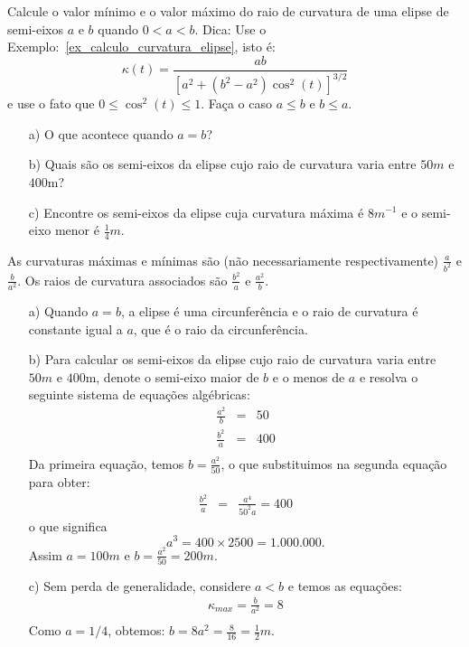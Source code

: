 \begin{exeresol}
Calcule o valor mínimo e o valor máximo do raio de curvatura de uma elipse de semi-eixos $a$ e $b$ quando $0<a<b$.
Dica: Use o Exemplo:~\ref{ex_calculo_curvatura_elipse}, isto é:
$$\kappa(t)=\frac{ab}{\left[a^2+(b^2-a^2)\cos^2(t)\right]^{3/2}}$$
e use o fato que $0\leq \cos^2(t) \leq1$. Faça o caso $a\leq b$ e $b \leq a$.

\begin{itemize}
 \item[a)] O que acontece quando $a=b$?
 \item[b)] Quais são os semi-eixos da elipse cujo raio de curvatura varia entre $50m$ e $400$m?
 \item[c)] Encontre os semi-eixos da elipse cuja curvatura máxima é $8m^{-1}$ e o semi-eixo menor é $\frac{1}{4}m$.
\end{itemize}
\end{exeresol}
\begin{resol}
As curvaturas máximas e mínimas são (não necessariamente respectivamente) $\frac{a}{b^2}$ e $\frac{b}{a^2}$. Os raios de curvatura associados são $\frac{b^2}{a}$ e $\frac{a^2}{b}$.
\begin{itemize}
 \item[a)] Quando $a=b$, a elipse é uma circunferência e o raio de curvatura é constante igual a $a$, que é o raio da circunferência.
\item[b)] Para calcular os semi-eixos da elipse cujo raio de curvatura varia entre $50m$ e $400$m, denote o semi-eixo maior de $b$ e o menos de $a$ e resolva o seguinte sistema de equações algébricas:
 \begin{eqnarray*}
  \frac{a^2}{b} &=& 50\\
  \frac{b^2}{a} &=& 400\\
 \end{eqnarray*}
 Da primeira equação, temos $b=\frac{a^2}{50}$, o que substituimos na segunda equação para obter:
 \begin{eqnarray*}
   \frac{b^2}{a} &=& \frac{a^4}{50^2a}=400
 \end{eqnarray*}
o que significa
$$a^3=400\times 2500 = 1.000.000.$$
 Assim $a=100m$ e $b=\frac{a^2}{50}=200m$.
\item[c)] Sem perda de generalidade, considere $a<b$ e temos as equações:
  \begin{eqnarray*}\kappa_{max}=\frac{b}{a^2}=8\\
  \end{eqnarray*}
     Como $a=1/4$, obtemos:
     $b=8a^2=\frac{8}{16}=\frac{1}{2}m$.
 \end{itemize}


\end{resol}

